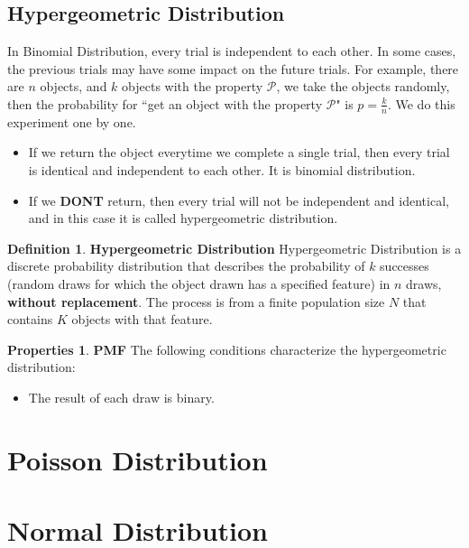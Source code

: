\documentclass{article}
\theoremstyle{definition}
\newtheorem{defi}{Definition}[section]
\newtheorem{prop}{Properties}[section]
\begin{document}
\subsection{Hypergeometric Distribution}

In Binomial Distribution, every trial is independent to each other. In some cases, the previous trials may have some impact on the future trials. For example, there are $n$ objects, and $k$ objects with the property $\mathcal{P}$, we take the objects randomly, then the probability for ``get an object with the property $\mathcal{P}$" is $p=\frac{k}{n}$. We do this experiment one by one.
\begin{itemize}
    \item If we return the object everytime we complete a single trial, then every trial is identical and independent to each other. It is binomial distribution.
    \item If we \textbf{DONT} return, then every trial will not be independent and identical, and in this case it is called hypergeometric distribution.
\end{itemize}

\begin{defi}
\textbf{Hypergeometric Distribution} Hypergeometric Distribution is a discrete probability distribution that describes the probability of $k$ successes (random draws for which the object drawn has a specified feature) in $n$ draws, \textbf{without replacement}. The process is from a finite population size $N$ that contains $K$ objects with that feature.
\end{defi}

\begin{prop}
\textbf{PMF} The following conditions characterize the hypergeometric distribution:
\begin{itemize}
    \item The result of each draw is binary.
\end{itemize}
\end{prop}

\section{Poisson Distribution}

\section{Normal Distribution}
\end{document}
